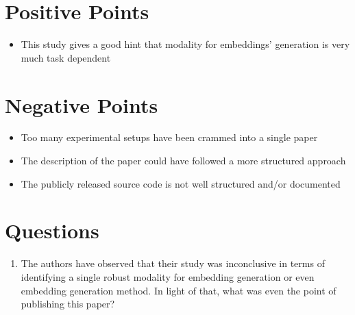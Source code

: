 \section{Positive Points}
\begin{itemize}
    \item This study gives a good hint that modality for embeddings' generation 
    is very much task dependent
\end{itemize}


\section{Negative Points}
\begin{itemize}
    \item Too many experimental setups have been crammed into a single paper
    \item The description of the paper could have followed a more structured
        approach
    \item The publicly released source code \cite{modalityChoicesCode} is not
        well structured and/or documented
\end{itemize}


\section{Questions}
\begin{enumerate}
    \item The authors have observed that their study was inconclusive in terms of
        identifying a single robust modality for embedding generation or even
        embedding generation method. In light of that, what was even the point of
        publishing this paper? 
\end{enumerate}